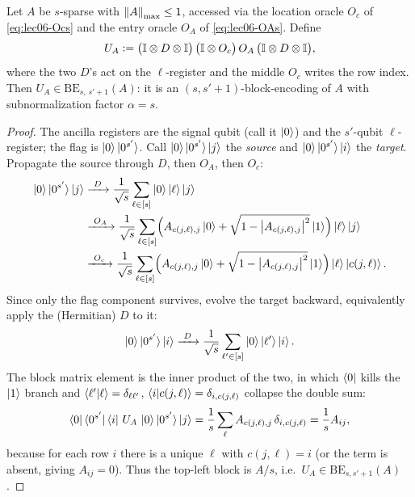\begin{theorem}
\label{thm:lec06-ssparse}
Let $A$ be $s$-sparse with $\left\lVert A \right\rVert_{\max}\le1$, accessed via the location oracle
$O_c$ of \eqref{eq:lec06-Ocs} and the entry oracle $O_A$ of \eqref{eq:lec06-OAs}.
Define
\begin{equation}
  U_A\vcentcolon=\bigl(\mathbb{I}\otimes D\otimes\mathbb{I}\bigr)\,
           \bigl(\mathbb{I}\otimes O_c\bigr)\,O_A\,
           \bigl(\mathbb{I}\otimes D\otimes\mathbb{I}\bigr),
  \label{eq:lec06-Uss}
\end{equation}
where the two $D$'s act on the $\ell$-register and the middle $O_c$ writes the row
index. Then $U_A\in\mathrm{BE}_{s,\,s'+1}(A)$: it is an $(s,s'+1)$-block-encoding of
$A$ with subnormalization factor $\alpha=s$.
\end{theorem}

\begin{proof}
The ancilla registers are the signal qubit (call it $\ket{0}$) and the $s'$-qubit
$\ell$-register; the flag is $\ket{0}\ket{0^{s'}}$. Call $\ket{0}\ket{0^{s'}}\ket{j}$
the \emph{source} and $\ket{0}\ket{0^{s'}}\ket{i}$ the \emph{target}. Propagate the
source through $D$, then $O_A$, then $O_c$:
\begin{align*}
  \ket{0}\ket{0^{s'}}\ket{j}
  &\xrightarrow{\ D\ }
    \frac{1}{\sqrt s}\sum_{\ell\in[s]}\ket{0}\ket{\ell}\ket{j}\\
  &\xrightarrow{\ O_A\ }
    \frac{1}{\sqrt s}\sum_{\ell\in[s]}
    \Bigl(A_{c(j,\ell),j}\ket{0}+\sqrt{1-\left\lvert A_{c(j,\ell),j} \right\rvert^2}\ket{1}\Bigr)
    \ket{\ell}\ket{j}\\
  &\xrightarrow{\ O_c\ }
    \frac{1}{\sqrt s}\sum_{\ell\in[s]}
    \Bigl(A_{c(j,\ell),j}\ket{0}+\sqrt{1-\left\lvert A_{c(j,\ell),j} \right\rvert^2}\ket{1}\Bigr)
    \ket{\ell}\ket{c(j,\ell)}.
\end{align*}
Since only the flag component survives, evolve the target backward, equivalently
apply the (Hermitian) $D$ to it:
\[
  \ket{0}\ket{0^{s'}}\ket{i}\xrightarrow{\ D\ }
   \frac{1}{\sqrt s}\sum_{\ell'\in[s]}\ket{0}\ket{\ell'}\ket{i}.
\]
The block matrix element is the inner product of the two, in which $\bra{0}$ kills
the $\ket{1}$ branch and $\braket{\ell'|\ell}=\delta_{\ell\ell'}$,
$\braket{i|c(j,\ell)}=\delta_{i,c(j,\ell)}$ collapse the double sum:
\[
  \bra{0}\bra{0^{s'}}\bra{i}\,U_A\,\ket{0}\ket{0^{s'}}\ket{j}
  =\frac{1}{s}\sum_{\ell}A_{c(j,\ell),j}\,\delta_{i,c(j,\ell)}
  =\frac{1}{s}A_{ij},
\]
because for each row $i$ there is a unique $\ell$ with $c(j,\ell)=i$ (or the term is
absent, giving $A_{ij}=0$). Thus the top-left block is $A/s$, i.e.\
$U_A\in\mathrm{BE}_{s,s'+1}(A)$.
\end{proof}

